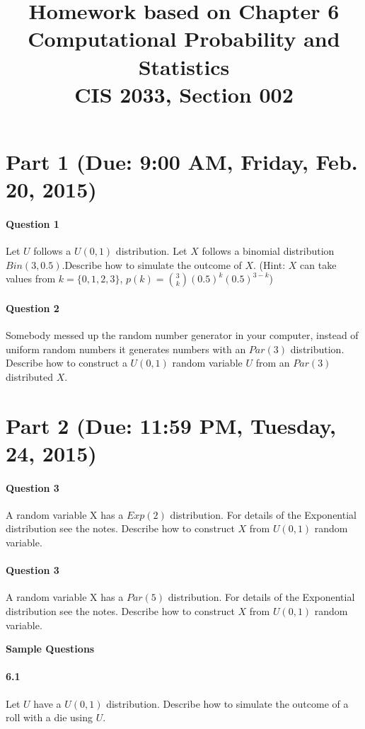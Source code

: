 \documentclass[11pt]{article} %
\title{Homework based on Chapter 6\\
Computational Probability and Statistics \\
CIS 2033, Section 002}
\author{}
\date{} %
\begin{document}
\maketitle

\section{Part 1 (Due: 9:00 AM, Friday, Feb. 20, 2015)}
\paragraph*{Question 1} Let $U$ follows a $U(0,1)$ distribution. Let $X$ follows a binomial distribution $Bin(3, 0.5)$.Describe how to simulate the outcome of $X$. (Hint: $X$ can take values from $k=\{0,1,2,3\}$, $p(k)={3 \choose k}(0.5)^k(0.5)^{3-k}$) 
\paragraph*{Question 2} Somebody messed up the random number generator in your computer, instead of uniform random numbers it generates numbers with an $Par(3)$ distribution. Describe how to construct a $U(0,1)$ random variable $U$ from an $Par(3)$ distributed $X$. 

\section{Part 2 (Due: 11:59 PM, Tuesday, 24, 2015)}

\paragraph*{Question 3} A random variable X has a $Exp(2)$ distribution. For details of the Exponential distribution see the notes. Describe how to construct $X$ from $U(0, 1)$ random variable. 

\paragraph*{Question 3} A random variable X has a $Par(5)$ distribution. For details of the Exponential distribution see the notes. Describe how to construct $X$ from $U(0, 1)$ random variable. 


\newpage
\textbf{Sample Questions}
\paragraph*{6.1} Let $U$ have a $U(0, 1)$ distribution. Describe how to simulate the outcome of a roll with a die using $U$. 
\end{document}
